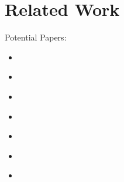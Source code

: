 \chapter{Related Work}\label{ch:rw}

Potential Papers:
\begin{itemize}
	\item \citet{Adner2006}
	\item \citet{Grasl2009}
	\item \citet{Porter2008}
	\item \citet{Cusumano2002}
	\item \citet{Cusumano2010}
	\item \citet{Drucker1994}
	\item \citet{Chesbrough2007}
\end{itemize}
